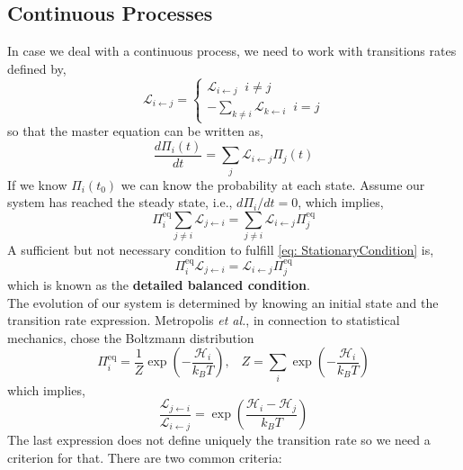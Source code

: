 \subsection{Continuous Processes}
In case we deal with a continuous process, we need to work with transitions rates defined by,
\begin{equation}
    \mathcal{L}_{i \leftarrow j} = 
    \begin{cases}
    \mathcal{L}_{i \leftarrow j} \;\; i\neq j\\
    -\sum_{k\neq i}\mathcal{L}_{k \leftarrow i} \;\; i = j
    \end{cases}
\end{equation}
so that the master equation can be written as,
\begin{equation}
\label{eq: MasterEquationContinuous}
    \frac{d\Pi_{i}(t)}{dt} = \sum_{j}\mathcal{L}_{i \leftarrow j} \Pi_{j}(t)
\end{equation}
If we know $\Pi_{i}(t_{0})$ we can know the probability at each state. Assume our system has reached the steady state, i.e., $d\Pi_{i}/dt = 0$, which implies,
\begin{equation}
\label{eq: StationaryCondition}
    \Pi_{i}^{\mathrm{eq}} \sum_{j\neq i} \mathcal{L}_{j \leftarrow i} = \sum_{j \neq i}\mathcal{L}_{i \leftarrow j}\Pi_{j}^{\mathrm{eq}} 
\end{equation}
A sufficient but not necessary condition to fulfill \ref{eq: StationaryCondition} is,
\begin{equation}
    \Pi_{i}^{\mathrm{eq}}\mathcal{L}_{j \leftarrow i} = \mathcal{L}_{i \leftarrow j}\Pi_{j}^{\mathrm{eq}} 
\end{equation}
which is known as the \textbf{detailed balanced condition}.\\
The evolution of our system is determined by knowing an initial state and the transition rate expression. Metropolis \textit{et al.}, in connection to statistical mechanics, chose the Boltzmann distribution
\begin{equation}
    \Pi_{i}^{\mathrm{eq}} = \frac{1}{Z}\exp\left(- \frac{\mathcal{H}_{i}}{k_{B}T}\right), \;\;\; Z = \sum_{i}\exp\left(-\frac{\mathcal{H}_{i}}{k_{B}T}\right)
\end{equation}
which implies,
\begin{equation}
    \frac{\mathcal{L}_{j \leftarrow i}}{\mathcal{L}_{i \leftarrow j}} = \exp\left(\frac{\mathcal{H}_{i} - \mathcal{H}_{j}}{k_{B}T}\right)
\end{equation}
The last expression does not define uniquely the transition rate so we need a criterion for that. There are two common criteria:
